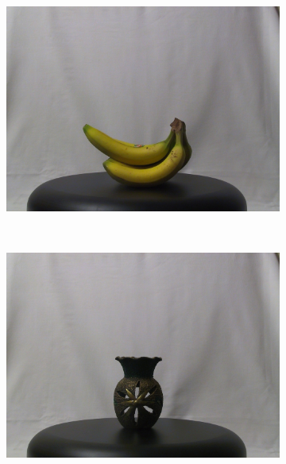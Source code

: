\documentclass[runningheads]{llncs}
\begin{document}
\begin{figure}[htb]
    \centering
    \begin{subfigure}[t]{0.15\columnwidth}
        \centering
        \includegraphics[width=1\columnwidth]{images/3d/1}
    \end{subfigure}%
    ~ %
    \begin{subfigure}[t]{0.15\columnwidth}
        \centering
        \includegraphics[width=1\columnwidth]{images/3d/2}
    \end{subfigure}%
    ~ %
    \begin{subfigure}[t]{0.15\columnwidth}
        \centering

\end{subfigure}
\end{figure}
\end{document}
